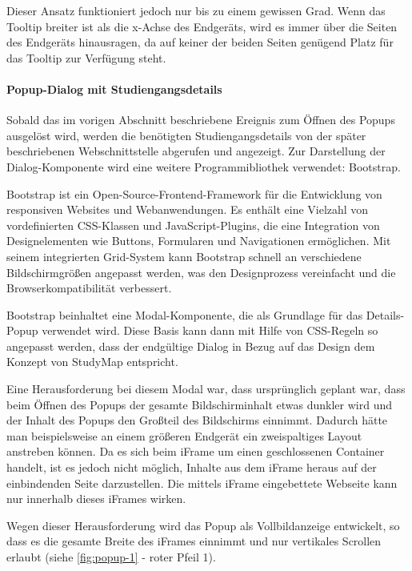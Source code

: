 Dieser Ansatz funktioniert jedoch nur bis zu einem gewissen Grad. Wenn das Tooltip breiter ist als die x-Achse des Endgeräts, wird es immer über die Seiten des Endgeräts hinausragen, da auf keiner der beiden Seiten genügend Platz für das Tooltip zur Verfügung steht. %

\paragraph*{Popup-Dialog mit Studiengangsdetails}
Sobald das im vorigen Abschnitt beschriebene Ereignis zum Öffnen des Popups ausgelöst wird, werden die benötigten Studiengangsdetails von der später beschriebenen Webschnittstelle abgerufen und angezeigt. Zur Darstellung der Dialog-Komponente wird eine weitere Programmibliothek verwendet: Bootstrap.

Bootstrap ist ein Open-Source-Frontend-Framework für die Entwicklung von responsiven Websites und Webanwendungen. Es enthält eine Vielzahl von vordefinierten CSS-Klassen und JavaScript-Plugins, die eine Integration von Designelementen wie Buttons, Formularen und Navigationen ermöglichen. \parencite{otto_bootstrap_2024} Mit seinem integrierten Grid-System kann Bootstrap schnell an verschiedene Bildschirmgrößen angepasst werden, was den Designprozess vereinfacht und die Browserkompatibilität verbessert. \parencite{otto_browsers_2024}

Bootstrap beinhaltet eine Modal-Komponente, die als Grundlage für das Details-Popup verwendet wird. \parencite{otto_modal_2024} Diese Basis kann dann mit Hilfe von CSS-Regeln so angepasst werden, dass der endgültige Dialog in Bezug auf das Design dem Konzept von StudyMap entspricht.

Eine Herausforderung bei diesem Modal war, dass ursprünglich geplant war, dass beim Öffnen des Popups der gesamte Bildschirminhalt etwas dunkler wird und der Inhalt des Popups den Großteil des Bildschirms einnimmt. Dadurch hätte man beispielsweise an einem größeren Endgerät ein zweispaltiges Layout anstreben können. Da es sich beim iFrame um einen geschlossenen Container handelt, ist es jedoch nicht möglich, Inhalte aus dem iFrame heraus auf der einbindenden Seite darzustellen. Die mittels iFrame eingebettete Webseite kann nur innerhalb dieses iFrames wirken. %

Wegen dieser Herausforderung wird das Popup als Vollbildanzeige entwickelt, so dass es die gesamte Breite des iFrames einnimmt und nur vertikales Scrollen erlaubt (siehe \autoref{fig:popup-1} - roter Pfeil 1).

